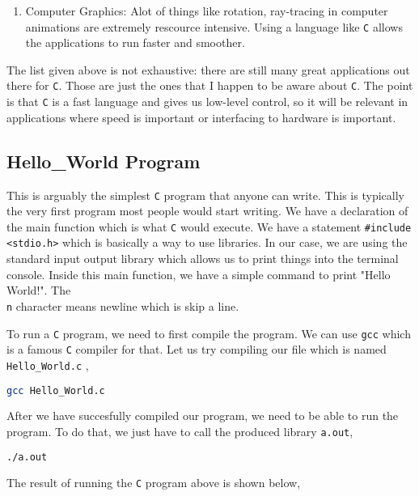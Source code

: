\documentclass[a4paper, 12pt]{report}
\begin{document}
\begin{center}
\begin{enumerate}
\item Computer Graphics: Alot of things like rotation, ray-tracing in computer animations are extremely rescource intensive.
Using a language like \texttt{C} allows the applications to run faster and smoother.
\end{enumerate}
The list given above is not exhaustive: there are still many great applications out there for \texttt{C}.
Those are just the ones that I happen to be aware about \texttt{C}.
The point is that \texttt{C} is a fast language and gives us low-level control, so it will be relevant in applications where speed is important or interfacing to hardware is important.

\subsection{Hello\_World Program}
\begin{comment}
\end{comment}
This is arguably the simplest \texttt{C} program that anyone can write. 
This is typically the very first program most people would start writing.
We have a declaration of the main function which is what \texttt{C} would execute.
We have a statement \texttt{\#include <stdio.h>} which is basically a way to use libraries.
In our case, we are using the standard input output library which allows us to print things into the terminal console.
Inside this main function, we have a simple command to print "Hello World!". 
The \texttt{\\n} character means newline which is skip a line.

$$$$
To run a \texttt{C} program, we need to first compile the program. 
We can use \texttt{gcc} which is a famous \texttt{C} compiler for that. 
Let us try compiling our file which is named \texttt{Hello\_World.c} ,
\begin{lstlisting}[language=Bash]
gcc Hello_World.c
\end{lstlisting}
After we have succesfully compiled our program, we need to be able to run the program.
To do that, we just have to call the produced library \texttt{a.out},
\begin{lstlisting}[language=Bash]
./a.out
\end{lstlisting}
$$$$
The result of running the \texttt{C} program above is shown below,




\end{center}
\end{document}
